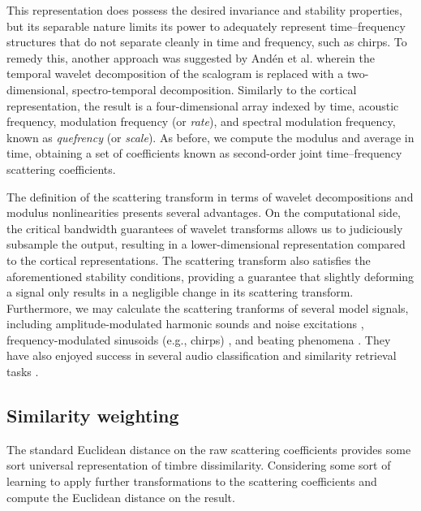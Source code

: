 \documentclass{bmcart}
\begin{document}
This representation does possess the desired invariance and stability properties, but its separable nature limits its power to adequately represent time--frequency structures that do not separate cleanly in time and frequency, such as chirps.
To remedy this, another approach was suggested by And\'{e}n et al. \cite{anden2015joint,anden2019joint} wherein the temporal wavelet decomposition of the scalogram is replaced with a two-dimensional, spectro-temporal decomposition.
Similarly to the cortical representation, the result is a four-dimensional array indexed by time, acoustic frequency, modulation frequency (or \emph{rate}), and spectral modulation frequency, known as \emph{quefrency} (or \emph{scale}).
As before, we compute the modulus and average in time, obtaining a set of coefficients known as second-order joint time--frequency scattering coefficients.

The definition of the scattering transform in terms of wavelet decompositions and modulus nonlinearities presents several advantages.
On the computational side, the critical bandwidth guarantees of wavelet transforms allows us to judiciously subsample the output, resulting in a lower-dimensional representation compared to the cortical representations.
The scattering transform also satisfies the aforementioned stability conditions, providing a guarantee that slightly deforming a signal only results in a negligible change in its scattering transform.
Furthermore, we may calculate the scattering tranforms of several model signals, including amplitude-modulated harmonic sounds and noise excitations \cite{anden2012scattering,anden2014deep}, frequency-modulated sinusoids (e.g., chirps) \cite{anden2012scattering,anden2019joint}, and beating phenomena \cite{anden2014deep}.
They have also enjoyed success in several audio classification and similarity retrieval tasks \cite{anden2011multiscale,bauge2013representing,anden2014deep,anden2019joint,lostanlen2018relevance,lostanlen2018extended}.

\subsection*{Similarity weighting}
\label{sec:weighting}

The standard Euclidean distance on the raw scattering coefficients  provides some sort universal representation of timbre dissimilarity. Considering some sort of learning to apply further transformations to the scattering coefficients and compute the Euclidean distance on the result.
\end{document}
